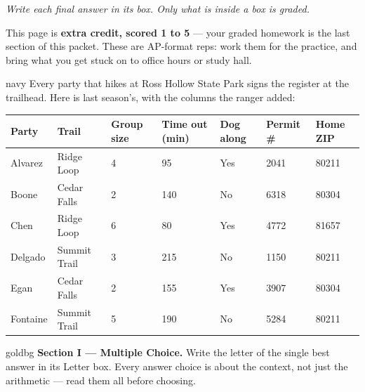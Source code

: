 \documentclass[12pt]{article}
\begin{document}
{\small\itshape Write each final answer in its box. Only what is inside a box is graded.}\par

\vspace{0.15in}

\boxguard[8]
\begin{remindbox}
\small
This page is \textbf{extra credit, scored 1 to 5} --- your graded homework is the last section
of this packet. These are AP-format reps: work them for the practice, and bring what you get
stuck on to office hours or study hall.
\end{remindbox}

\vspace{0.12in}

\boxguard[30]
\begin{scenariobox}{navy}
\small
Every party that hikes at Ross Hollow State Park signs the register at the trailhead. Here is
last season's, with the columns the ranger added:

\vspace{8pt}
\renewcommand{\arraystretch}{1.3}
\begin{tabularx}{\linewidth}{@{} l Y Y Y Y Y Y @{}}
\textbf{Party} & \textbf{Trail} & \textbf{Group size} & \textbf{Time out (min)} &
\textbf{Dog along} & \textbf{Permit \#} & \textbf{Home ZIP} \\
\hline
Alvarez  & Ridge Loop   & 4 &  95 & Yes & 2041 & 80211 \\
Boone    & Cedar Falls  & 2 & 140 & No  & 6318 & 80304 \\
Chen     & Ridge Loop   & 6 &  80 & Yes & 4772 & 81657 \\
Delgado  & Summit Trail & 3 & 215 & No  & 1150 & 80211 \\
Egan     & Cedar Falls  & 2 & 155 & Yes & 3907 & 80304 \\
Fontaine & Summit Trail & 5 & 190 & No  & 5284 & 80211 \\
\hline
\end{tabularx}
\end{scenariobox}

\vspace{0.14in}

\boxguard[16]
\begin{headlinebox}{goldbg}
\small
\textbf{Section I --- Multiple Choice.} Write the letter of the single best answer in its Letter box. Every answer choice is
about the context, not just the arithmetic --- read them all before choosing.
\end{headlinebox}
\end{document}
